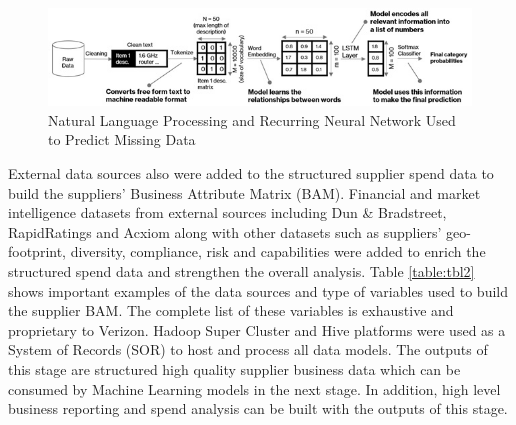 \documentclass[inte,nonblindrev]{informs3} %
\begin{document}
\begin{figure}
	\includegraphics[angle=0, width=1.0\textwidth]{RNN.jpg}
    \caption{Natural Language Processing and Recurring Neural Network Used to Predict Missing Data}
    \label{fig:fig2RNN}
\end{figure}

External data sources also were added to the structured supplier spend data to build the suppliers' Business Attribute Matrix (BAM). Financial and market intelligence datasets from external sources including Dun \& Bradstreet, RapidRatings and Acxiom along with other datasets such as suppliers' geo-footprint, diversity, compliance, risk and capabilities were added to enrich the structured spend data and strengthen the overall analysis. Table \ref{table:tbl2} shows important examples of the data sources and type of variables used to build the supplier BAM. The complete list of these variables is exhaustive and proprietary to Verizon. Hadoop Super Cluster and Hive platforms were used as a System of Records (SOR) to host and process all data models. The outputs of this stage are structured high quality supplier business data which can be consumed by Machine Learning models in the next stage. In addition,  high level business reporting and spend analysis can be built with the outputs of this stage. 
\end{document}
